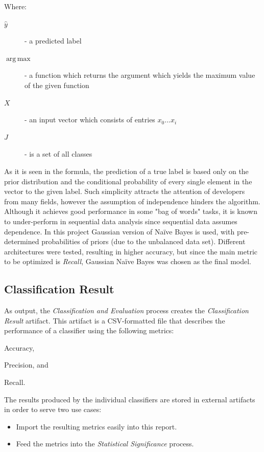 \documentclass[conference]{sig-alternate-05-2015}
\DeclareMathOperator*{\argmax}{arg\,max}
\begin{document}
\noindent Where:
\begin{description}
  \item[$\hat{y}$] - a predicted label
  \item[$\argmax$] - a function which returns the argument which yields the
  maximum value of the given function
  \item[$X$] - an input vector which consists of entries ${x_0 ... x_i}$
  \item[$J$] - is a set of all classes
\end{description}

As it is seen in the formula, the prediction of a true label is based only on
the prior distribution and the conditional probability of every single element
in the vector to the given label. Such simplicity attracts the attention of
developers from many fields, however the assumption of independence hinders the
algorithm. Although it achieves good performance in some "bag of words" tasks,
it is known to under-perform in sequential data analysis since sequential data
assumes dependence. In this project Gaussian version of Na\"ive Bayes is used,
with pre-determined probabilities of priors (due to the unbalanced data set).
Different architectures were tested, resulting in higher accuracy, but since the
main metric to be optimized is \textit{Recall}, Gaussian Na\"ive Bayes was
chosen as the final model.

\subsection{Classification Result}\label{subsec:classification_result}
As output, the \textit{Classification and Evaluation} process creates the
\textit{Classification Result} artifact. This artifact is a CSV-formatted file
that describes the performance of a classifier using the following metrics:
\begin{enumerate*}[(1)]
  \item Accuracy,
  \item Precision, and
  \item Recall.
\end{enumerate*}

The results produced by the individual classifiers are stored in external
artifacts in order to serve two use cases:

\begin{itemize}
  \item Import the resulting metrics easily into this report.
  \item Feed the metrics into the \textit{Statistical Significance} process.
\end{itemize}
\end{document}
